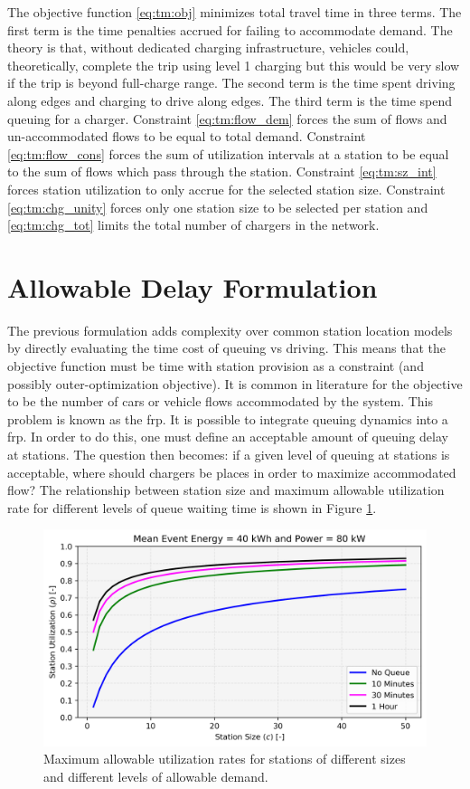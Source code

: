 \documentclass[12pt]{article}
\begin{document}
The objective function \eqref{eq:tm:obj} minimizes total travel time in three terms. The first term is the time penalties accrued for failing to accommodate demand. The theory is that, without dedicated charging infrastructure, vehicles could, theoretically, complete the trip using level 1 charging but this would be very slow if the trip is beyond full-charge range. The second term is the time spent driving along edges and charging to drive along edges. The third term is the time spend queuing for a charger. Constraint \eqref{eq:tm:flow_dem} forces the sum of flows and un-accommodated flows to be equal to total demand. Constraint \eqref{eq:tm:flow_cons} forces the sum of utilization intervals at a station to be equal to the sum of flows which pass through the station. Constraint \eqref{eq:tm:sz_int} forces station utilization to only accrue for the selected station size. Constraint \eqref{eq:tm:chg_unity} forces only one station size to be selected per station and \eqref{eq:tm:chg_tot} limits the total number of chargers in the network.

\section{Allowable Delay Formulation}

The previous formulation adds complexity over common station location models by directly evaluating the time cost of queuing vs driving. This means that the objective function must be time with station provision as a constraint (and possibly outer-optimization objective). It is common in literature for the objective to be the number of cars or vehicle flows accommodated by the system. This problem is known as the \gls{frp}. It is possible to integrate queuing dynamics into a \gls{frp}. In order to do this, one must define an acceptable amount of queuing delay at stations. The question then becomes: if a given level of queuing at stations is acceptable, where should chargers be places in order to maximize accommodated flow? The relationship between station size and maximum allowable utilization rate for different levels of queue waiting time is shown in Figure \ref{fig:delay}.

\begin{figure}[H]
	\centering
	\includegraphics[width = .7\linewidth]{figs/delay.png}
	\caption{Maximum allowable utilization rates for stations of different sizes and different levels of allowable demand.}
	\label{fig:delay}
\end{figure}
\end{document}
